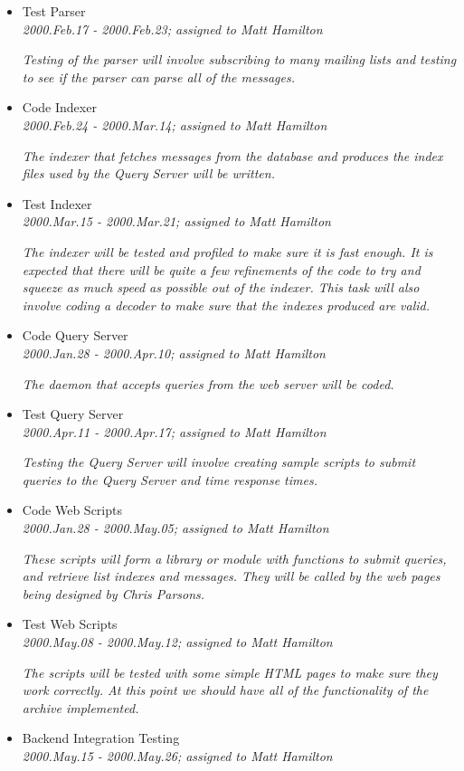 \begin{itemize}
{\em The parser that decodes messages and inserts the into the database will be coded}
\item Test Parser\\{\em 2000.Feb.17 - 2000.Feb.23; assigned to Matt Hamilton}

{\em Testing of the parser will involve subscribing to many mailing lists and testing to see if the parser can parse all of the messages.}
\item Code Indexer\\{\em 2000.Feb.24 - 2000.Mar.14; assigned to Matt Hamilton}

{\em The indexer that fetches messages from the database and produces the index files used by the Query Server will be written.}
\item Test Indexer\\{\em 2000.Mar.15 - 2000.Mar.21; assigned to Matt Hamilton}

{\em The indexer will be tested and profiled to make sure it is fast enough.  It is expected that there will be quite a few refinements of the code to try and squeeze as much speed as possible out of the indexer.  This task will also involve coding a decoder to make sure that the indexes produced are valid.}
\item Code Query Server\\{\em 2000.Jan.28 - 2000.Apr.10; assigned to Matt Hamilton}

{\em The daemon that accepts queries from the web server will be coded.}
\item Test Query Server\\{\em 2000.Apr.11 - 2000.Apr.17; assigned to Matt Hamilton}

{\em Testing the Query Server will involve creating sample scripts to submit queries to the Query Server and time response times.}
\item Code Web Scripts\\{\em 2000.Jan.28 - 2000.May.05; assigned to Matt Hamilton}

{\em These scripts will form a library or module with functions to submit queries, and retrieve list indexes and messages.  They will be called by the web pages being designed by Chris Parsons.}
\item Test Web Scripts\\{\em 2000.May.08 - 2000.May.12; assigned to Matt Hamilton}

{\em The scripts will be tested with some simple HTML pages to make sure they work correctly.  At this point we should have all of the functionality of the archive implemented.}
\item Backend Integration Testing\\{\em 2000.May.15 - 2000.May.26; assigned to Matt Hamilton}


\end{itemize}

